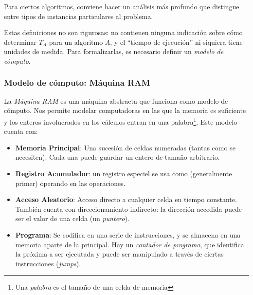\documentclass[a4paper]{report}
\begin{document}
Para ciertos algoritmos, conviene hacer un análisis más profundo que distingue entre tipos de instancias particulares al problema.

Estas definiciones no son rigurosas: no contienen ninguna indicación sobre cómo determinar $T_A$ para un algoritmo $A$, y el ``tiempo de ejecución'' ni siquiera tiene unidades de medida. Para formalizarlas, es necesario definir un \textit{modelo de cómputo}.

\subsubsection{Modelo de cómputo: Máquina RAM}
\label{maquina-ram}

La \textit{Máquina RAM} es una máquina abstracta que funciona como modelo de cómputo. Nos permite modelar computadoras en las que la memoria es suficiente y los enteros involucrados en los cálculos entran en una palabra\footnote{Una \textit{palabra} es el tamaño de una celda de memoria}. Este modelo cuenta con:
\begin{itemize}
    \item \textbf{Memoria Principal}: Una sucesión de celdas numeradas (tantas como se necesiten). Cada una puede guardar un entero de tamaño arbitrario.
    \item \textbf{Registro Acumulador}: un registro especiel se usa como (generalmente primer) operando en las operaciones.
    \item \textbf{Acceso Aleatorio}: Acceso directo a cualquier celda en tiempo constante. También cuenta con direccionamiento indirecto: la dirección accedida puede ser el valor de una celda (un \textit{puntero}).
    \item \textbf{Programa}: Se codifica en una serie de instrucciones, y se almacena en una memoria aparte de la principal. Hay un \textit{contador de programa}, que identifica la próxima a ser ejecutada y puede ser manipulado a través de ciertas instrucciones (\textit{jumps}).
\end{itemize}
\end{document}
